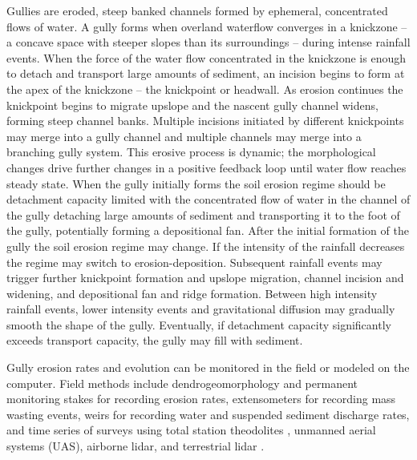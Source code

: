 \documentclass[esurf, manuscript]{copernicus}
\begin{document}
Gullies are eroded, steep banked channels 
formed by ephemeral, concentrated flows of water.
A gully forms when overland waterflow
converges in a knickzone
-- a concave space with steeper slopes than its surroundings -- 
during intense rainfall events.  
When the force of the water flow concentrated in the knickzone
is enough to detach and transport large amounts of sediment,
an incision begins to form at the apex of the knickzone 
-- the knickpoint or headwall.
As erosion continues the knickpoint begins to migrate upslope
and the nascent gully channel widens,
forming steep channel banks. 
Multiple incisions initiated by different knickpoints 
may merge into a gully channel
and multiple channels may merge into a branching gully system. 
This erosive process is dynamic; 
the morphological changes drive further changes 
in a positive feedback loop
until water flow reaches steady state. 
When the gully initially forms 
the soil erosion regime should be detachment capacity limited
with the concentrated flow of water in the channel of the gully 
detaching large amounts of sediment and transporting it to the foot of the gully, 
potentially forming a depositional fan. 
After the initial formation of the gully
the soil erosion regime may change.
If the intensity of the rainfall decreases
the regime may switch to erosion-deposition. 
Subsequent rainfall events may trigger further 
knickpoint formation and upslope migration, channel incision and widening, and
depositional fan and ridge formation. 
Between high intensity rainfall events, 
lower intensity events and gravitational diffusion
may gradually smooth the shape of the gully. 
Eventually, if detachment capacity significantly exceeds transport capacity, 
the gully may fill with sediment. 

Gully erosion rates and evolution
can be monitored in the field 
or modeled on the computer. 
Field methods include
dendrogeomorphology \cite{Malik2008} and 
permanent monitoring stakes for recording erosion rates, 
extensometers for recording mass wasting events, 
weirs for recording water and suspended sediment discharge rates, 
and time series of surveys using 
total station theodolites \cite{Thomas2004},
unmanned aerial systems (UAS),
airborne lidar, and terrestrial lidar \cite{Starek2011,Bechet2016}.
\end{document}
